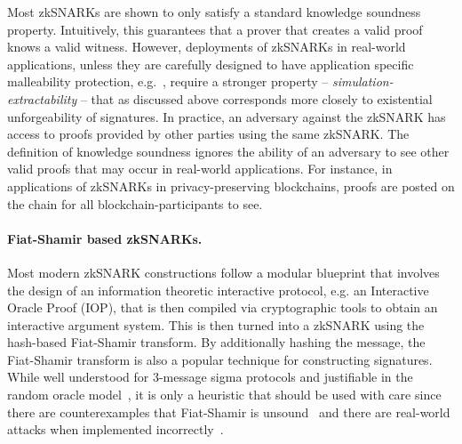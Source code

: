 Most zkSNARKs are shown to only satisfy a standard knowledge soundness
property. Intuitively, this guarantees that a prover that creates a valid proof knows
a valid witness. However, deployments of zkSNARKs in real-world applications, unless
they are carefully designed to have application specific malleability protection,
e.g.~\cite{SP:BCGGMT14}, require a stronger property --
\textit{simulation-extractability} -- that as discussed above corresponds more
closely to existential unforgeability of signatures.  In practice, an adversary
against the zkSNARK has access to proofs provided by other parties using the same
zkSNARK. The definition of knowledge soundness ignores the ability of an adversary
to see other valid proofs that may occur in real-world applications. For instance,
in applications of zkSNARKs in privacy-preserving blockchains, proofs are posted on
the chain for all blockchain-participants to see.

\paragraph{Fiat-Shamir based zkSNARKs.}
Most modern zkSNARK constructions follow a modular blueprint that involves the design of an information theoretic interactive protocol, e.g. an Interactive Oracle Proof (IOP), that is then compiled via cryptographic tools to obtain an interactive argument system.  This is then turned into a zkSNARK using the hash-based Fiat-Shamir transform. By additionally hashing the message, the Fiat-Shamir transform is also a popular technique for constructing signatures. While well understood for 3-message sigma protocols and justifiable in the random oracle
model~\cite{CCS:BelRog93}, it is only a heuristic that should be used with
care since there are counterexamples that Fiat-Shamir is
unsound~\cite{FOCS:GolKal03} and there are real-world attacks when implemented incorrectly~\cite{Blog:FrozenHeart20}.

